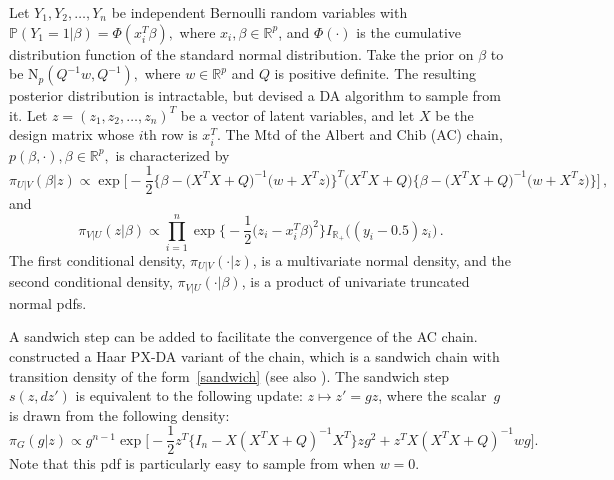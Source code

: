 \documentclass[11pt]{article}
\begin{document}
	Let $Y_1,Y_2,\dots, Y_n$ be independent Bernoulli random
        variables with $\mathbb{P}(Y_1=1|\beta) = \Phi(x_i^T\beta),$ where $x_i,\beta
        \in \mathbb{R}^p$, and $\Phi(\cdot)$ is the cumulative distribution function of the standard normal distribution.  Take the prior on $\beta$ to be
        $\mbox{N}_p(Q^{-1}w, Q^{-1}),$ where $w \in \mathbb{R}^p$ and $Q$ is
        positive definite. The resulting posterior distribution is
        intractable, but \cite{albert1993bayesian} devised a DA
        algorithm to sample from it. Let $z=(z_1,z_2,\dots,z_n)^T$ be
        a vector of latent variables, and let $X$ be the design matrix
        whose $i$th row is $x_i^T.$ The Mtd of the Albert and Chib
        (AC) chain, $p(\beta,\cdot), \beta \in \mathbb{R}^p,$ is
        characterized by
	\[
        \pi_{U|V} (\beta|z) \propto \exp \bigg[ -\frac{1}{2} \big\{
        \beta - \big( X^TX+Q \big)^{-1} \big( w+X^Tz \big) \big\}^T
        \big( X^TX + Q \big) \big\{ \beta - \big( X^TX+Q \big)^{-1}
        \big( w+X^Tz \big) \big\} \bigg] \,,
        \]
        and
        \[
        \pi_{V|U}(z|\beta) \propto \prod_{i=1}^{n}\exp \bigg\{
        -\frac{1}{2}\big(z_i-x_i^T\beta\big)^2 \bigg\}
        I_{\mathbb{R}_+}\big((y_i-0.5)z_i \big) \,.
        \]
	The first conditional density, $\pi_{U|V}(\cdot|z)$, is a
        multivariate normal density, and the second conditional
        density, $\pi_{V|U}(\cdot|\beta)$, is a product of univariate
        truncated normal pdfs.  
        
        A sandwich step can be added to facilitate the convergence of
        the AC chain. \cite{chakraborty2016convergence} constructed a
        Haar PX-DA variant of the chain, which is a sandwich chain
        with transition density of the form~\eqref{sandwich} (see also
        \cite{roy2007convergence}). The sandwich step $s(z, dz')$ is
        equivalent to the following update: $z \mapsto z' = gz$, where
        the scalar~$g$ is drawn from the following density:
        \[
        \pi_G(g|z) \propto g^{n-1} \exp \bigg[ -\frac{1}{2} z^T\big\{ I_n - X(X^TX+Q)^{-1}X^T \big\} z g^2 + z^TX(X^TX + Q)^{-1}w g   \bigg].
        \]
        Note that this pdf is particularly easy to sample from when $w = 0$.
        
\end{document}
